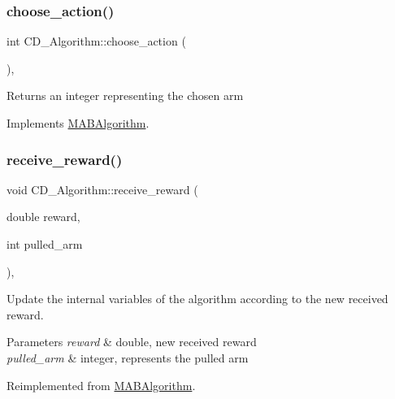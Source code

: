 \subsubsection{\texorpdfstring{choose\+\_\+action()}{choose\_action()}}
{\footnotesize\ttfamily int C\+D\+\_\+\+Algorithm\+::choose\+\_\+action (\begin{DoxyParamCaption}{ }\end{DoxyParamCaption})\hspace{0.3cm}{\ttfamily [override]}, {\ttfamily [virtual]}}

\begin{DoxyReturn}{Returns}
an integer representing the chosen arm 
\end{DoxyReturn}


Implements \mbox{\hyperlink{class_m_a_b_algorithm_afb48f01df0e1860d19759f6e20335007}{M\+A\+B\+Algorithm}}.

\mbox{\label{class_c_d___algorithm_a2427ddf68550eda00a0992b875c10834}} 
\subsubsection{\texorpdfstring{receive\+\_\+reward()}{receive\_reward()}}
{\footnotesize\ttfamily void C\+D\+\_\+\+Algorithm\+::receive\+\_\+reward (\begin{DoxyParamCaption}\item[{double}]{reward,  }\item[{int}]{pulled\+\_\+arm }\end{DoxyParamCaption})\hspace{0.3cm}{\ttfamily [override]}, {\ttfamily [virtual]}}



Update the internal variables of the algorithm according to the new received reward. 


\begin{DoxyParams}{Parameters}
{\em reward} & double, new received reward \\
\hline
{\em pulled\+\_\+arm} & integer, represents the pulled arm \\
\hline
\end{DoxyParams}


Reimplemented from \mbox{\hyperlink{class_m_a_b_algorithm_aa584b3d6b86fa050e3389be9781b5782}{M\+A\+B\+Algorithm}}.

